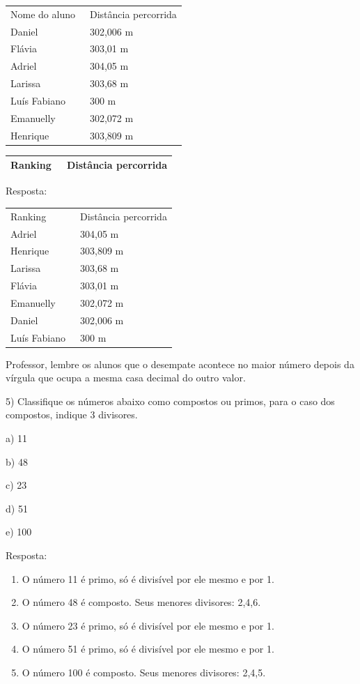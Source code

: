 {\begin{longtable}[]{@{}ll@{}}
\toprule
\endhead
Nome do aluno~ & Distância percorrida\tabularnewline
Daniel~ & 302,006 m\tabularnewline
Flávia~ & 303,01 m\tabularnewline
Adriel~ & 304,05 m\tabularnewline
Larissa~ & 303,68 m\tabularnewline
Luís Fabiano~ & 300 m~\tabularnewline
Emanuelly~ & 302,072 m\tabularnewline
Henrique~ & 303,809 m\tabularnewline
\bottomrule
\end{longtable}

\begin{longtable}[]{@{}ll@{}}
\toprule
\endhead
\begin{minipage}[t]{0.14\columnwidth}\raggedright
Ranking~\strut
\end{minipage} & \begin{minipage}[t]{0.30\columnwidth}\raggedright
Distância percorrida\strut
\end{minipage}\tabularnewline
\bottomrule
\end{longtable}

Resposta:

\begin{longtable}[]{@{}ll@{}}
\toprule
\endhead
Ranking~ & Distância percorrida\tabularnewline
Adriel~ & 304,05 m\tabularnewline
Henrique~ & 303,809 m\tabularnewline
Larissa~ & 303,68 m\tabularnewline
Flávia~ & 303,01 m\tabularnewline
Emanuelly~ & 302,072 m\tabularnewline
Daniel~ & 302,006 m\tabularnewline
Luís Fabiano~ & 300 m~\tabularnewline
\bottomrule
\end{longtable}

Professor, lembre os alunos que o desempate acontece no maior número
depois da vírgula que ocupa a mesma casa decimal do outro valor.

5) Classifique os números abaixo como compostos ou primos, para o caso
dos compostos, indique 3 divisores.

a) 11

b) 48

c) 23

d) 51

e) 100

Resposta:

\begin{enumerate}
\def\labelenumi{\alph{enumi})}
\item
  O número 11 é primo, só é divisível por ele mesmo e por 1.
\item
  O número 48 é composto. Seus menores divisores: 2,4,6.
\item
  O número 23 é primo, só é divisível por ele mesmo e por 1.
\item
  O número 51 é primo, só é divisível por ele mesmo e por 1.
\item
  O número 100 é composto. Seus menores divisores: 2,4,5.
\end{enumerate}

}
